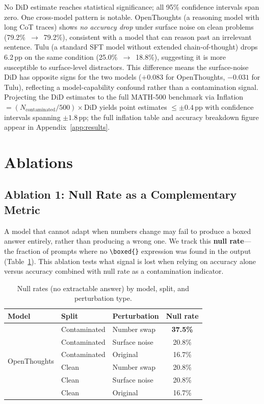 \documentclass{article} %
\begin{document}
No DiD estimate reaches statistical significance; all 95\% confidence intervals span zero. One cross-model pattern is notable. OpenThoughts (a reasoning model with long CoT traces) shows \emph{no accuracy drop} under surface noise on clean problems (79.2\%~$\to$~79.2\%), consistent with a model that can reason past an irrelevant sentence. Tulu (a standard SFT model without extended chain-of-thought) drops 6.2\,pp on the same condition (25.0\%~$\to$~18.8\%), suggesting it is more susceptible to surface-level distractors. This difference means the surface-noise DiD has opposite signs for the two models ($+0.083$ for OpenThoughts, $-0.031$ for Tulu), reflecting a model-capability confound rather than a contamination signal. Projecting the DiD estimates to the full MATH-500 benchmark via Inflation $= (N_{\text{contaminated}} / 500) \times \text{DiD}$ yields point estimates $\leq \pm0.4$\,pp with confidence intervals spanning $\pm1.8$\,pp; the full inflation table and accuracy breakdown figure appear in Appendix~\ref{app:results}.

\section{Ablations}

\subsection{Ablation 1: Null Rate as a Complementary Metric}

A model that cannot adapt when numbers change may fail to produce a boxed answer entirely, rather than producing a wrong one. We track this \textbf{null rate}---the fraction of prompts where no \texttt{\textbackslash boxed\{\}} expression was found in the output (Table~\ref{tab:nullrates}). This ablation tests what signal is lost when relying on accuracy alone versus accuracy combined with null rate as a contamination indicator.

\begin{table}[h]
\centering
\caption{Null rates (no extractable answer) by model, split, and perturbation type.}
\label{tab:nullrates}
\begin{tabular}{lllc}
\toprule
\textbf{Model} & \textbf{Split} & \textbf{Perturbation} & \textbf{Null rate} \\
\midrule
\multirow{6}{*}{OpenThoughts}
  & Contaminated & Number swap   & \textbf{37.5\%} \\
  & Contaminated & Surface noise & 20.8\% \\
  & Contaminated & Original      & 16.7\% \\
  & Clean        & Number swap   & 20.8\% \\
  & Clean        & Surface noise & 20.8\% \\
  & Clean        & Original      & 16.7\% \\
\midrule
\bottomrule
\end{tabular}
\end{table}
\end{document}
